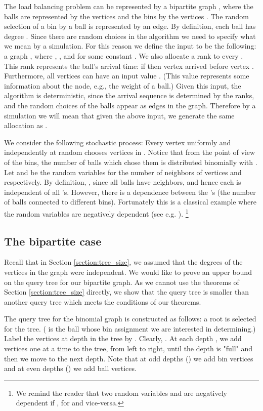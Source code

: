 \documentclass[english, oribibl]{llncs}
\begin{document}
The load balancing problem can be represented by a bipartite graph ,
where the balls are represented by the vertices  and the bins by the vertices .
The random selection of a bin   by a ball  is represented by an edge.
By definition, each ball  has degree . 
Since there are random choices in the algorithm  we need to specify what we mean by a simulation. For this reason we define the input to be the following:
a graph 
  , where , , and  for some constant . We also allocate a rank  to every . This rank represents the ball's arrival time: if  then vertex  arrived before vertex . Furthermore, all vertices can have an input value . (This value represents some information about the node, e.g., the weight of a ball.)
Given this input, the algorithm  is deterministic, since the arrival sequence is determined by the ranks, and the random choices of the balls appear as edges in the graph. Therefore by a simulation we will mean that given the above input, we generate the same allocation as .





We consider the following stochastic process: 
Every vertex  uniformly and independently at random chooses  vertices in .
Notice that from the point of view of the bins,
the number of balls which chose them is distributed binomially with .
Let  and  be the random variables for the number of neighbors of vertices  and  respectively.
By definition, , since all balls have  neighbors, and hence
each  is independent of all 's.
However, there is a dependence between the 's (the number of balls connected to different bins).
Fortunately this is a classical example where the random variables are negatively dependent (see e.g. \cite{DR96}).
\footnote{We remind the reader that two random variables  and  are negatively dependent if
, for  and vice-versa.}

\subsection{The bipartite case}
Recall that in Section \ref{section:tree_size},
we assumed that the degrees of the vertices in the graph were independent.
We would like to prove an  upper bound on the query tree  for our bipartite graph.  As we cannot use the theorems of Section \ref{section:tree_size}
directly, we show that the query tree is smaller than another query tree which meets the conditions of our theorems.

The query tree for the binomial graph is constructed as follows: a root  is selected for the tree. ( is the ball whose bin assignment we are interested in determining.)            Label the vertices at depth  in
the tree by . Clearly, . At each depth , we add vertices one at a time to the tree, from left to right, until the depth is "full" and then we 
move to the next depth. Note that at odd depths () we add bin vertices and at even depths () we add ball vertices.
\end{document}
